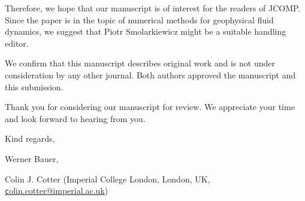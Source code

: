 \documentclass[a4paper,12pt]{article}
\begin{document}
Therefore, we hope that our manuscript is of interest for the readers
of JCOMP. Since the paper is in the topic of numerical methods for
geophysical fluid dynamics, we suggest that Piotr Smolarkiewicz might
be a suitable handling editor.

\vspace{0.8em}

We confirm that this manuscript describes original work and is not under consideration by any other journal. 
Both authors approved the manuscript and this submission.

\vspace{0.8em}

Thank you for considering our manuscript for review. We appreciate your time and look forward to hearing 
from you. 

\vspace{1.5em}

Kind regards,

\vspace{1.5em}

Werner Bauer,  \\

\vspace{-0.5em}

Colin J. Cotter
(Imperial College London, London, UK,
\href{mailto:colin.cotter@imperial.ac.uk}{\texttt colin.cotter@imperial.ac.uk})

%
%



\end{document}
